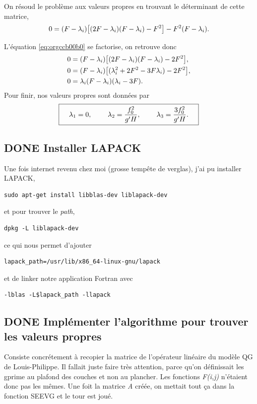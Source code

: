 \documentclass[10pt]{article}
\numberwithin{equation}{section}
\begin{document}
On résoud le problème aux valeurs propres en trouvant le déterminant de cette matrice,
\begin{equation}
\label{eq:orgccb00b0}
0 = (F-\lambda_i)\qty[(2F - \lambda_i)(F-\lambda_i) - F^2] - F^2(F-\lambda_i).
\end{equation}

L'équation \ref{eq:orgccb00b0} se factorise, on retrouve donc
\begin{align}
&0 = (F-\lambda_i)\qty[(2F - \lambda_i)(F-\lambda_i) - 2F^2],\nonumber\\
&0 = (F-\lambda_i)\qty[(\lambda^2_i + 2F^2 - 3 F \lambda_i) - 2F^2],\nonumber\\
&0 = \lambda_i \qty(F-\lambda_i)\qty(\lambda_i - 3F).
\end{align}
Pour finir, nos valeurs propres sont données par
\begin{align}
\boxed{\hspace{0.4cm} \lambda_1 = 0,
\hspace{0.8cm} \lambda_2 = \frac{f_0^2}{g' H}, 
\hspace{0.8cm} \lambda_3 = \frac{3 f_0^2}{g'H}. \hspace{0.4cm}}   
\end{align}

\subsection{{\bfseries\sffamily DONE} Installer LAPACK}
\label{sec:orgba9c52a}
Une fois internet revenu chez moi (grosse tempête de verglas), j'ai pu installer LAPACK,
\begin{verbatim}
sudo apt-get install libblas-dev liblapack-dev
\end{verbatim}
et pour trouver le \emph{path},
\begin{verbatim}
dpkg -L liblapack-dev
\end{verbatim}
ce qui nous permet d'ajouter
\begin{verbatim}
lapack_path=/usr/lib/x86_64-linux-gnu/lapack
\end{verbatim}
et de linker notre application Fortran avec
\begin{verbatim}
-lblas -L$lapack_path -llapack
\end{verbatim}

\subsection{{\bfseries\sffamily DONE} Implémenter l'algorithme pour trouver les valeurs propres}
\label{sec:org91aeb42}
Consiste concrétement à recopier la matrice de l'opérateur linéaire du modèle QG de Louis-Philippe.
Il fallait juste faire très attention, parce qu'on définissait les gprime au plafond des couches et non au plancher.
Les fonctions \emph{F(i,j)} n'étaient donc pas les mêmes.
Une foit la matrice \emph{A} créée, on mettait tout ça dans la fonction SEEVG et le tour est joué.
\end{document}
